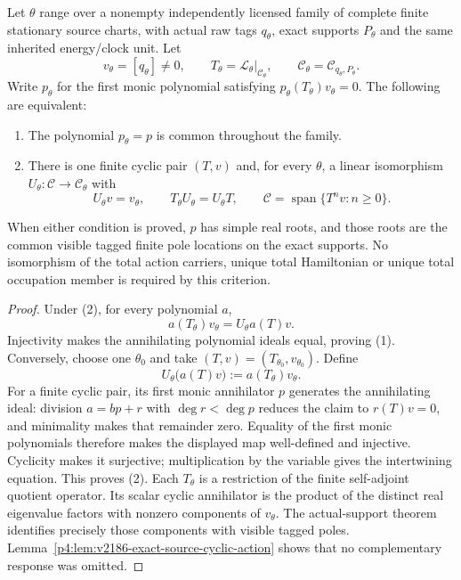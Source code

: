 \documentclass[12pt,a4paper]{article}
\begin{document}
\begin{theorem}
\label{p4:thm:v2186-common-source-cyclic-polynomial}
Let $\theta$ range over a nonempty independently licensed family of complete
finite stationary source charts, with actual raw tags $q_\theta$, exact
supports $P_\theta$ and the same inherited energy/clock unit.  Let
\[
 v_\theta=[q_\theta]\ne0,\qquad
 T_\theta=\mathcal L_\theta|_{\mathscr C_\theta},\qquad
 \mathscr C_\theta=\mathscr C_{q_\theta,P_\theta}.
\]
Write $p_\theta$ for the first monic polynomial satisfying
$p_\theta(T_\theta)v_\theta=0$.  The following are equivalent:
\begin{enumerate}
\item The polynomial $p_\theta=p$ is common throughout the family.
\item There is one finite cyclic pair $(T,v)$ and, for every $\theta$,
a linear isomorphism $U_\theta:\mathscr C\to\mathscr C_\theta$ with
\[
 \boxed{U_\theta v=v_\theta,\qquad
               T_\theta U_\theta=U_\theta T,\qquad
 \mathscr C=\operatorname{span}\{T^nv:n\ge0\}.}
\]
\end{enumerate}
When either condition is proved, $p$ has simple real roots, and those roots
are the common visible tagged finite pole locations on the exact supports.
No isomorphism of the total action carriers, unique total Hamiltonian or
unique total occupation member is required by this criterion.
\end{theorem}
\begin{proof}
Under (2), for every polynomial $a$,
\[
 a(T_\theta)v_\theta=U_\theta a(T)v.
\]
Injectivity makes the annihilating polynomial ideals equal, proving (1).
Conversely, choose one $\theta_0$ and take
$(T,v)=(T_{\theta_0},v_{\theta_0})$.  Define
\[
 U_\theta\bigl(a(T)v\bigr):=a(T_\theta)v_\theta.
\]
For a finite cyclic pair, its first monic annihilator $p$ generates the
annihilating ideal: division $a=bp+r$ with $\deg r<\deg p$ reduces the
claim to $r(T)v=0$, and minimality makes that remainder zero.  Equality
of the first monic polynomials therefore makes the displayed map
well-defined and injective.  Cyclicity makes it surjective; multiplication
by the variable gives the intertwining equation.  This proves (2).
Each $T_\theta$ is a restriction of the finite self-adjoint quotient
operator.  Its scalar cyclic annihilator is the product of the distinct
real eigenvalue factors with nonzero components of $v_\theta$.
The actual-support theorem identifies precisely those components with
visible tagged poles.  Lemma~\ref{p4:lem:v2186-exact-source-cyclic-action}
shows that no complementary response was omitted.
\end{proof}
\end{document}
